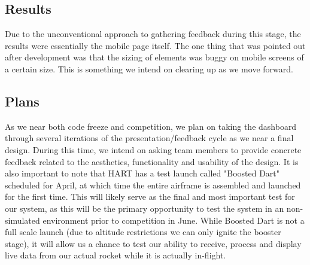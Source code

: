 \documentclass[journal,10pt,onecolumn,compsoc]{IEEEtran}
\begin{document}
  \subsection{Results}
    Due to the unconventional approach to gathering feedback during this stage, the results were essentially the mobile page itself.
    The one thing that was pointed out after development was that the sizing of elements was buggy on mobile screens of a certain size.
    This is something we intend on clearing up as we move forward.
  
	\subsection{Plans}
		As we near both code freeze and competition, we plan on taking the dashboard through several iterations of the presentation/feedback cycle as we near a final design.
		During this time, we intend on asking team members to provide concrete feedback related to the aesthetics, functionality and usability of the design.
		It is also important to note that HART has a test launch called "Boosted Dart" scheduled for April, at which time the entire airframe is assembled and launched for the first time.
		This will likely serve as the final and most important test for our system, as this will be the primary opportunity to test the system in an non-simulated environment prior to competition in June.
		While Boosted Dart is not a full scale launch (due to altitude restrictions we can only ignite the booster stage), it will allow us a chance to test our ability to receive, process and display live data from our actual rocket while it is actually in-flight.
		
\newpage


\end{document}
